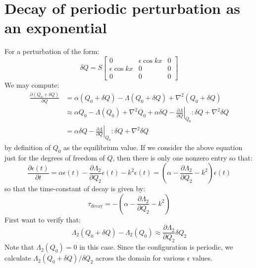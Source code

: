 \documentclass[reqno]{article}
\begin{document}
\section{Decay of periodic perturbation as an exponential}
For a perturbation of the form:
\begin{equation}
    \delta Q
    =
    S
    \begin{bmatrix}
        0 &\epsilon \cos kx &0 \\
        \epsilon \cos kx &0 &0 \\
        0 &0 &0
    \end{bmatrix}
\end{equation}
We may compute:
\begin{equation}
    \begin{split}
        \frac{\partial (Q_0 + \delta Q)}{\partial Q}
        &=
        \alpha (Q_0 + \delta Q) 
        - \Lambda(Q_0 + \delta Q) 
        + \nabla^2 (Q_0 + \delta Q) \\
        &\approx
        \alpha Q_0 - \Lambda (Q_0) + \nabla^2 Q_0
        + \alpha \delta Q - \left. \frac{\partial \Lambda}{\partial Q} \right|_{Q_0} : \delta Q + \nabla^2 \delta Q \\
        &= \alpha \delta Q - \left. \frac{\partial \Lambda}{\partial Q} \right|_{Q_0} : \delta Q + \nabla^2 \delta Q
    \end{split}
\end{equation}
by definition of $Q_0$ as the equilibrium value. 
If we consider the above equation just for the degrees of freedom of $Q$, then there is only one nonzero entry so that:
\begin{equation}
    \frac{\partial \epsilon(t)}{\partial t}
    =
    \alpha \epsilon(t) - \frac{\partial \Lambda_2}{\partial Q_2} \epsilon(t) - k^2 \epsilon(t)
    =
    \left(\alpha - \frac{\partial \Lambda_2}{\partial Q_2} - k^2 \right) \epsilon(t)
\end{equation}
so that the time-constant of decay is given by:
\begin{equation}
    \tau_\text{decay}
    =
    -\left(\alpha - \frac{\partial \Lambda_2}{\partial Q_2} - k^2 \right)
\end{equation}
First want to verify that:
\begin{equation}
    \Lambda_2 (Q_0 + \delta Q) - \Lambda_2(Q_0)
    \approx
    \frac{\partial \Lambda_2}{\partial Q_2} \delta Q_2
\end{equation}
Note that $\Lambda_2(Q_0) = 0$ in this case.
Since the configuration is periodic, we calculate $\Lambda_2(Q_0 + \delta Q) / \delta Q_2$ across the domain for various $\epsilon$ values.
\end{document}

